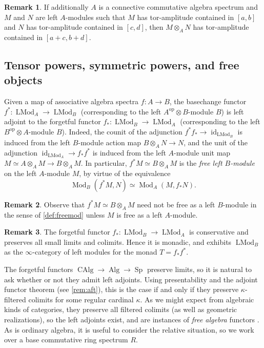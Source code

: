 \documentclass[12pt]{article}
\theoremstyle{definition}
\newtheorem{remark}{Remark}[subsection]
\renewcommand{\i}{\infty}
\newcommand{\op}{\mathrm{op}}
\DeclareMathOperator{\LMod}{LMod}
\DeclareMathOperator{\Mod}{Mod}
\DeclareMathOperator{\Alg}{Alg}
\DeclareMathOperator{\CAlg}{CAlg}
\DeclareMathOperator{\id}{id}
\DeclareMathOperator{\Sp}{Sp}
\begin{document}
\begin{remark}
If additionally $A$ is a connective commutative algebra spectrum and $M$ and $N$ are left $A$-modules such that $M$ has tor-amplitude contained in $[a,b]$ and $N$ has tor-amplitude contained in $[c,d]$, then   $M\otimes_A N$ has tor-amplitude contained in $[a+c,b+d]$.
\end{remark}

\subsection{Tensor powers, symmetric powers, and free objects}


Given a map of associative algebra spectra $f:A\to B$, the basechange functor $f^*:\LMod_A\to\LMod_B$ (corresponding to the left $A^{\op}\otimes B$-module $B$) is left adjoint to the forgetful functor $f_*:\LMod_B\to\LMod_A$ (corresponding to the left $B^{\op}\otimes A$-module $B$).
Indeed, the counit of the adjunction $f^*f_*\to\id_{\LMod_B}$ is induced from the left $B$-module action map $B\otimes_A N\to N$, and the unit of the adjunction $\id_{\LMod_A}\to f_*f^*$ is induced from the left $A$-module unit map $M\simeq A\otimes_A M\to B\otimes_A M$.
In particular, $f^*M\simeq B\otimes_A M$ is the {\em free left $B$-module} on the left $A$-module $M$, by virtue of the equivalence
\[
\Mod_B(f^*M,N)\simeq\Mod_A(M,f_*N).
\]
\begin{remark}
Observe that $f^*M\simeq B\otimes_A M$ need not be free as a left $B$-module in the sense of \autoref{def:freemod} unless $M$ is free as a left $A$-module.
\end{remark}
\begin{remark}
The forgetful functor $f_*:\LMod_B\to\LMod_A$ is conservative and preserves all small limits and colimits.
Hence it is monadic, and exhibits $\LMod_B$ as the $\i$-category of left modules for the monad $T=f_* f^*$.
\end{remark}

The forgetful functors $\CAlg\to\Alg\to\Sp$ preserve limits, so it is natural to ask whether or not they admit left adjoints.
Using presentability and the adjoint functor theorem (see \autoref{rem:aft}), this is the case if and only if they preserve $\kappa$-filtered colimits for some regular cardinal $\kappa$.
As we might expect from algebraic kinds of categories, they preserve all filtered colimits (as well as geometric realizations), so the left adjoints exist, and are instances of {\em free algebra} functors \cite{HA}.
As is ordinary algebra, it is useful to consider the relative situation, so we work over a base commutative ring spectrum $R$.
\end{document}
